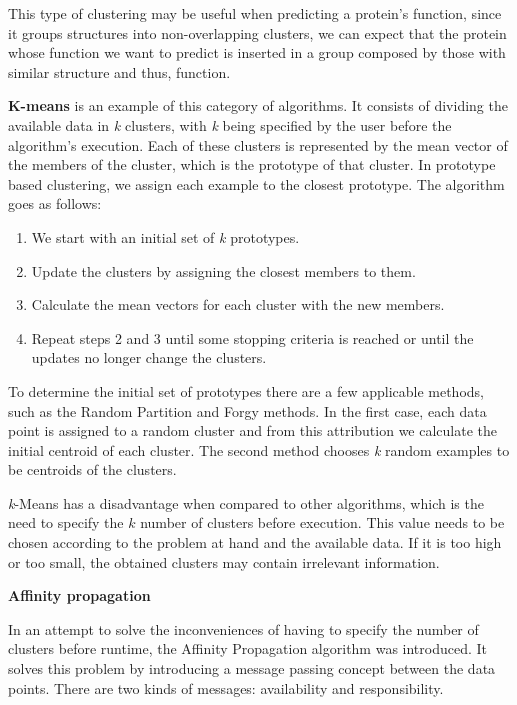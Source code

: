 This type of clustering may be useful when predicting a protein's function, since it groups structures into non-overlapping clusters, we can expect that the protein whose function we want to predict is inserted in a group composed by those with similar structure and thus, function.

\textbf{K-means} \cite{ethemalpaydin2010} is an example of this category of algorithms. It consists of dividing the available data in \textit{k} clusters, with \textit{k} being specified by the user before the algorithm's execution. Each of these clusters is represented by the mean vector of the members of the cluster, which is the prototype of that cluster. In prototype based clustering, we assign each example to the closest prototype. The algorithm goes as follows:

\begin{enumerate}
	\item We start with an initial set of \textit{k} prototypes.
	\item Update the clusters by assigning the closest members to them.
	\item Calculate the mean vectors for each cluster with the new members.
	\item Repeat steps 2 and 3 until some stopping criteria is reached or until the updates no longer change the clusters.
\end{enumerate}

To determine the initial set of prototypes there are a few applicable methods, such as the Random Partition and Forgy methods. In the first case, each data point is assigned to a random cluster and from this attribution we calculate the initial centroid of each cluster. The second method chooses \textit{k} random examples to be centroids of the clusters.

\textit{k}-Means has a disadvantage when compared to other algorithms, which is the need to specify the $k$ number of clusters before execution. This value needs to be chosen according to the problem at hand and the available data. If it is too high or too small, the obtained clusters may contain irrelevant information.

\medskip
\textbf{Affinity propagation}

In an attempt to solve the inconveniences of having to specify the number of clusters before runtime, the Affinity Propagation \cite{frey2007clustering} algorithm was introduced. It solves this problem by introducing a message passing concept between the data points. There are two kinds of messages: availability and responsibility. 

